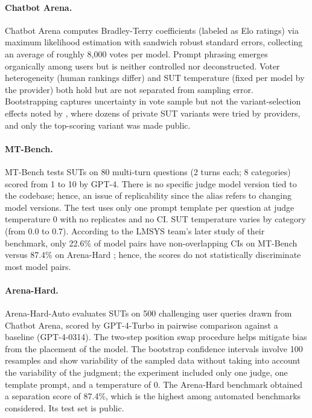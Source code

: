 \paragraph{Chatbot Arena.} Chatbot Arena \citep{chiang2024chatbot} computes Bradley-Terry \citep{bradley1952rank} coefficients (labeled as Elo ratings) via maximum likelihood estimation with sandwich robust standard errors, collecting an average of roughly 8,000 votes per model. Prompt phrasing emerges organically among users but is neither controlled nor deconstructed. Voter heterogeneity (human rankings differ) and SUT temperature (fixed per model by the provider) both hold but are not separated from sampling error. Bootstrapping captures uncertainty in vote sample but not the variant-selection effects noted by \citet{singh2025leaderboard}, where dozens of private SUT variants were tried by providers, and only the top-scoring variant was made public.

\paragraph{MT-Bench.} MT-Bench \citep{zheng2023llmjudge} tests SUTs on 80 multi-turn questions (2 turns each; 8 categories) scored from 1 to 10 by GPT-4. There is no specific judge model version tied to the codebase; hence, an issue of replicability since the alias refers to changing model versions. The test uses only one prompt template per question at judge temperature 0 with no replicates and no CI. SUT temperature varies by category (from 0.0 to 0.7). According to the LMSYS team's later study of their benchmark, only 22.6\% of model pairs have non-overlapping CIs on MT-Bench versus 87.4\% on Arena-Hard \citep{li2024arenahard}; hence, the scores do not statistically discriminate most model pairs.

\paragraph{Arena-Hard.} Arena-Hard-Auto \citep{li2024arenahard} evaluates SUTs on 500 challenging user queries drawn from Chatbot Arena, scored by GPT-4-Turbo in pairwise comparison against a baseline (GPT-4-0314). The two-step position swap procedure helps mitigate bias from the placement of the model. The bootstrap confidence intervals involve 100 resamples and show variability of the sampled data without taking into account the variability of the judgment; the experiment included only one judge, one template prompt, and a temperature of 0. The Arena-Hard benchmark obtained a separation score of 87.4\%, which is the highest among automated benchmarks considered. Its test set is public.

